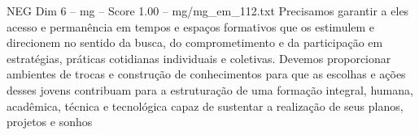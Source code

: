 \begin{textsample}{NEG Dim 6 – mg – Score 1.00 – mg/mg\_em\_112.txt}
Precisamos garantir a eles acesso e permanência em tempos e espaços formativos que os estimulem e direcionem no sentido da busca, do comprometimento e da participação em estratégias, práticas cotidianas individuais e coletivas.
Devemos proporcionar ambientes de trocas e construção de conhecimentos para que as escolhas e ações desses jovens contribuam para a estruturação de uma formação integral, humana, acadêmica, técnica e tecnológica capaz de sustentar a realização de seus planos, projetos e sonhos

\end{textsample}
